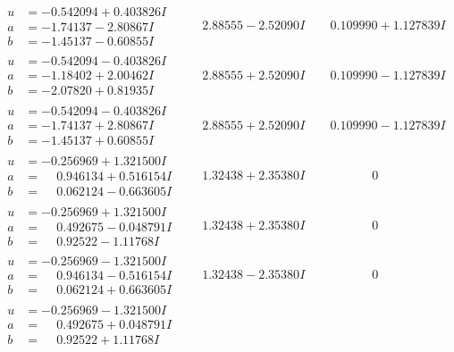 \documentclass[1p]{elsarticle_modified}
\theoremstyle{definition}
\begin{document}
$$\begin{array}{c|c|c}
\begin{aligned}
u &= -0.542094 + 0.403826 I \\
a &= -1.74137 - 2.80867 I \\
b &= -1.45137 - 0.60855 I\end{aligned}
 & \phantom{-}2.88555 - 2.52090 I & \phantom{-}0.109990 + 1.127839 I \\ \hline\begin{aligned}
u &= -0.542094 - 0.403826 I \\
a &= -1.18402 + 2.00462 I \\
b &= -2.07820 + 0.81935 I\end{aligned}
 & \phantom{-}2.88555 + 2.52090 I & \phantom{-}0.109990 - 1.127839 I \\ \hline\begin{aligned}
u &= -0.542094 - 0.403826 I \\
a &= -1.74137 + 2.80867 I \\
b &= -1.45137 + 0.60855 I\end{aligned}
 & \phantom{-}2.88555 + 2.52090 I & \phantom{-}0.109990 - 1.127839 I \\ \hline\begin{aligned}
u &= -0.256969 + 1.321500 I \\
a &= \phantom{-}0.946134 + 0.516154 I \\
b &= \phantom{-}0.062124 - 0.663605 I\end{aligned}
 & \phantom{-}1.32438 + 2.35380 I & \phantom{-0.000000 } 0 \\ \hline\begin{aligned}
u &= -0.256969 + 1.321500 I \\
a &= \phantom{-}0.492675 - 0.048791 I \\
b &= \phantom{-}0.92522 - 1.11768 I\end{aligned}
 & \phantom{-}1.32438 + 2.35380 I & \phantom{-0.000000 } 0 \\ \hline\begin{aligned}
u &= -0.256969 - 1.321500 I \\
a &= \phantom{-}0.946134 - 0.516154 I \\
b &= \phantom{-}0.062124 + 0.663605 I\end{aligned}
 & \phantom{-}1.32438 - 2.35380 I & \phantom{-0.000000 } 0 \\ \hline\begin{aligned}
u &= -0.256969 - 1.321500 I \\
a &= \phantom{-}0.492675 + 0.048791 I \\
b &= \phantom{-}0.92522 + 1.11768 I\end{aligned}

\end{array}$$
\end{document}
